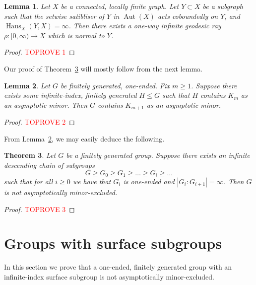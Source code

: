 \documentclass[10pt,a4paper]{amsart}
\DeclareMathOperator{\dHaus}{Haus}
\DeclareMathOperator{\Aut}{Aut}
\newtheorem{theorem}{Theorem}[section]
\newtheorem{lemma}[theorem]{Lemma}
\theoremstyle{definition}
\begin{document}
\begin{lemma}\label{lem:normal-ray-subgroup}
    Let $X$ be a connected, locally finite graph. Let $Y \subset X$ be a subgraph such that the setwise satibliser of $Y$ in $ \Aut(X)$ acts coboundedly on $Y$, and $\dHaus_X(Y, X) = \infty$. Then there exists a one-way infinite geodesic ray $\rho : [0,\infty) \to X$ which is normal to $Y$. 
\end{lemma}

\begin{proof}\textcolor{red}{TOPROVE 1}\end{proof}

Our proof of Theorem~\ref{thm:descending-chain} will mostly follow from the next lemma.

\begin{lemma}\label{lem:induct}
    Let $G$ be finitely generated, one-ended. 
    Fix $m \geq 1$. Suppose there exists some infinite-index, finitely generated $H \leq G$ such that $H$ contains $K_m$ as an asymptotic minor. 
    Then $G$ contains $K_{m+1}$ as an asymptotic minor. 
\end{lemma}

\begin{proof}\textcolor{red}{TOPROVE 2}\end{proof}

From Lemma~\ref{lem:induct}, we may easily deduce the following. 


\begin{theorem}\label{thm:descending-chain}
Let $G$ be a finitely generated group. Suppose  there exists an infinite descending chain of subgroups
        $$
        G \geq G_0 \geq G_1 \geq  \ldots \geq G_i \geq \ldots 
        $$
        such that for all $i \geq 0$ we have that $G_i$ is one-ended and $|G_i : G_{i+1}| = \infty$.
    Then $G$ is not asymptotically minor-excluded. 
\end{theorem}

\begin{proof}\textcolor{red}{TOPROVE 3}\end{proof}


\section{Groups with surface subgroups}\label{sec:plane}

In this section we prove that a one-ended, finitely generated group with an infinite-index surface subgroup is not asymptotically minor-excluded. 
\end{document}

